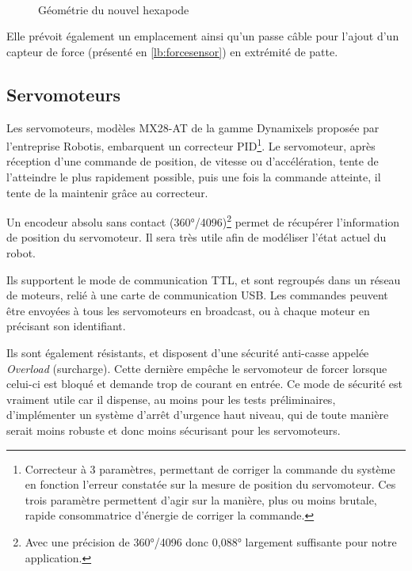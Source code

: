 \documentclass{tnreport}
\begin{document}
\begin{figure}[h]
\centering
{}\qquad
{}\\
\caption{Géométrie du nouvel hexapode}
\label{fig:fox}
\end{figure}

Elle prévoit également un emplacement ainsi qu'un passe câble pour l'ajout d'un capteur de force (présenté en \ref{lb:forcesensor}) en extrémité de patte. 

\subsection{Servomoteurs}\label{lb:servo}
Les \glspl{servomoteur}, modèles MX28-AT de la gamme Dynamixels proposée par l'entreprise Robotis, embarquent un correcteur PID\footnote{Correcteur à 3 paramètres, permettant de corriger la commande du système en fonction l'erreur constatée sur la mesure de position du \gls{servomoteur}. Ces trois paramètre permettent d'agir sur la manière, plus ou moins brutale, rapide consommatrice d'énergie de corriger la commande. }. Le \gls{servomoteur}, après réception d'une commande de position, de vitesse ou d'accélération, tente de l'atteindre le plus rapidement possible, puis une fois la commande atteinte, il tente de la maintenir grâce au correcteur. 

Un encodeur absolu sans contact (360°/4096)\footnote{Avec une précision de 360°/4096 donc 0,088° largement suffisante pour notre application.} permet de récupérer l'information de position du \gls{servomoteur}. Il sera très utile afin de modéliser l'état actuel du robot.

Ils supportent le mode de communication TTL, et sont regroupés dans un réseau de moteurs, relié à une carte de communication USB. Les commandes peuvent être envoyées à tous les \glspl{servomoteur} en broadcast, ou à chaque moteur en précisant son identifiant.

Ils sont également résistants, et disposent d'une sécurité anti-casse appelée \textit{Overload} (surcharge). Cette dernière empêche le \gls{servomoteur} de forcer lorsque celui-ci est bloqué et demande trop de courant en entrée. Ce mode de sécurité est vraiment utile car il dispense, au moins pour les tests préliminaires, d'implémenter un système d'arrêt d'urgence haut niveau, qui de toute manière serait moins robuste et donc moins sécurisant pour les \glspl{servomoteur}.
\end{document}
